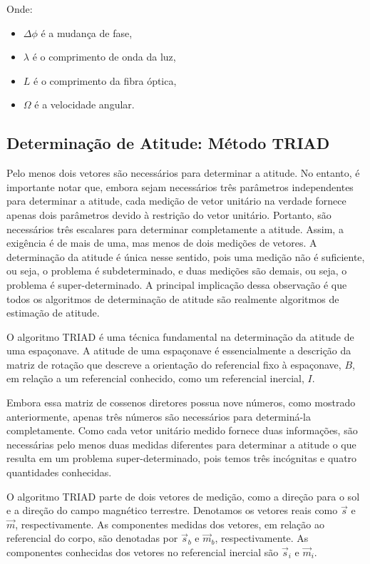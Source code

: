  	Onde:
 	
\begin{itemize}
 		\item $\Delta \phi$ é a mudança de fase,
 		\item $\lambda$ é o comprimento de onda da luz,
 		\item $L$ é o comprimento da fibra óptica,
 		\item $\Omega$ é a velocidade angular.
\end{itemize}
 

\subsection{Determinação de Atitude: Método TRIAD}\label{sec:3.1.5}

Pelo menos dois vetores são necessários para determinar a atitude. No entanto, é importante notar que, embora sejam necessários três parâmetros independentes para determinar a atitude, cada medição de vetor unitário na verdade fornece apenas dois parâmetros devido à restrição do vetor unitário. Portanto, são necessários três escalares para determinar completamente a atitude. Assim, a exigência é de mais de uma, mas menos de dois medições de vetores. A determinação da atitude é única nesse sentido, pois uma medição não é suficiente, ou seja, o problema é subdeterminado, e duas medições são demais, ou seja, o problema é super-determinado. A principal implicação dessa observação é que todos os algoritmos de determinação de atitude são realmente algoritmos de estimação de atitude.

O algoritmo TRIAD é uma técnica fundamental na determinação da atitude de uma espaçonave. A atitude de uma espaçonave é essencialmente a descrição da matriz de rotação que descreve a orientação do referencial fixo à espaçonave, $B$, em relação a um referencial conhecido, como um referencial inercial, $I$.

Embora essa matriz de cossenos diretores possua nove números, como mostrado anteriormente, apenas três números são necessários para determiná-la completamente. Como cada vetor unitário medido fornece duas informações, são necessárias pelo menos duas medidas diferentes para determinar a atitude o que resulta em um problema super-determinado, pois temos três incógnitas e quatro quantidades conhecidas.

O algoritmo TRIAD parte de dois vetores de medição, como a direção para o sol e a direção do campo magnético terrestre. Denotamos os vetores reais como $\vec{s}$ e $\vec{m}$, respectivamente. As componentes medidas dos vetores, em relação ao referencial do corpo, são denotadas por $\vec{s}_b$ e $\vec{m}_b$, respectivamente. As componentes conhecidas dos vetores no referencial inercial são $\vec{s}_i$ e $\vec{m}_i$.

